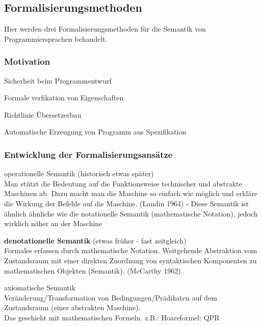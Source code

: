 \subsection{Formalisierungsmethoden}
Hier werden drei Formalisierungsmethoden für die Semantik von Programmiersprachen behandelt.\\
\subsubsection*{Motivation}
\begin{compactitem}
	\item Sicherheit beim Programmentwurf\\
	\item Formale verfikation von Eigenschaften\\
	\item Richtlinie Übersetzerbau\\
	\item Automatische Erzeugung von Programm aus Spezifikation\\
\end{compactitem}

\subsubsection*{Entwicklung der Formalisierungsansätze}
\begin{compactitem}
	\item operationelle Semantik (historisch etwas später)\\
	Man stützt die Bedeutung auf die Funktionsweise technischer und abstrakte Maschinen ab. Dazu macht man die Maschine so einfach wie möglich und erkläre die Wirkung der Befehle auf die Maschine. (Landin 1964) - Diese Semantik ist ähnlich ähnliche wie die notationelle Semantik (mathematische Notation), jedoch wirklich näher an der Maschine\\
	\item \textbf{denotationelle Semantik} (etwas früher - fast zeitgleich)\\ 
	Formales erfassen durch mathematische Notation. Weitgehende Abstraktion vom Zustandsraum mit einer direkten Zuordnung von syntaktischen Komponenten zu mathematischen Objekten (Semantik). (McCarthy 1962)\\
	\item axiomatische Semantik\\
	Veränderung/Transformation von Bedingungen/Prädikaten auf dem Zustandsraum (einer abstrakten Maschine).\\
	Das geschieht mit mathematischen Formeln. z.B.: Hoareformel: {Q}P{R}\\
\end{compactitem}

